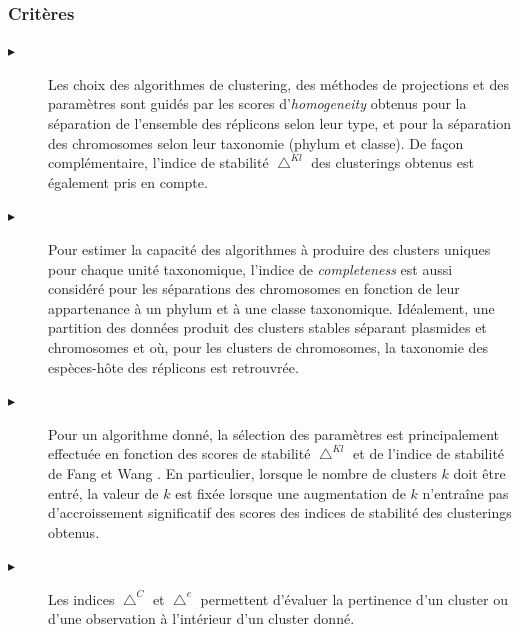 \subsubsection{Critères}
\begin{description}
	\item[$\blacktriangleright$] Les choix des algorithmes de clustering, des méthodes de projections et des paramètres sont guidés par les scores d'\textit{homogeneity} obtenus pour la séparation de l'ensemble des réplicons selon leur type, et pour la séparation des chromosomes selon leur taxonomie (phylum et classe). De façon complémentaire, l'indice de stabilité $\bigtriangleup^{Kl}$ des clusterings obtenus est également pris en compte. 
	\item[$\blacktriangleright$] Pour estimer la capacité des algorithmes à produire des clusters uniques pour chaque unité taxonomique, l'indice de \textit{completeness} est aussi considéré pour les séparations des chromosomes en fonction de leur appartenance à un phylum et à une classe taxonomique. Idéalement, une partition des données produit des clusters stables séparant plasmides et chromosomes et où, pour les clusters de chromosomes, la taxonomie des espèces-hôte des réplicons est retrouvrée.
	\item[$\blacktriangleright$] Pour un algorithme donné, la sélection des paramètres est principalement effectuée en fonction des scores de stabilité $\bigtriangleup^{Kl}$ et de l'indice de stabilité de Fang et Wang \citep{Fang2010}. En particulier, lorsque le nombre de clusters $k$ doit être entré, la valeur de $k$ est fixée lorsque une augmentation de $k$ n'entraîne pas d'accroissement significatif des scores des indices de stabilité des clusterings obtenus. 
	\item[$\blacktriangleright$] Les indices $\bigtriangleup^{C}$ et $\bigtriangleup^{e}$ permettent d'évaluer la pertinence d'un cluster ou d'une observation à l'intérieur d'un cluster donné.
\end{description}

